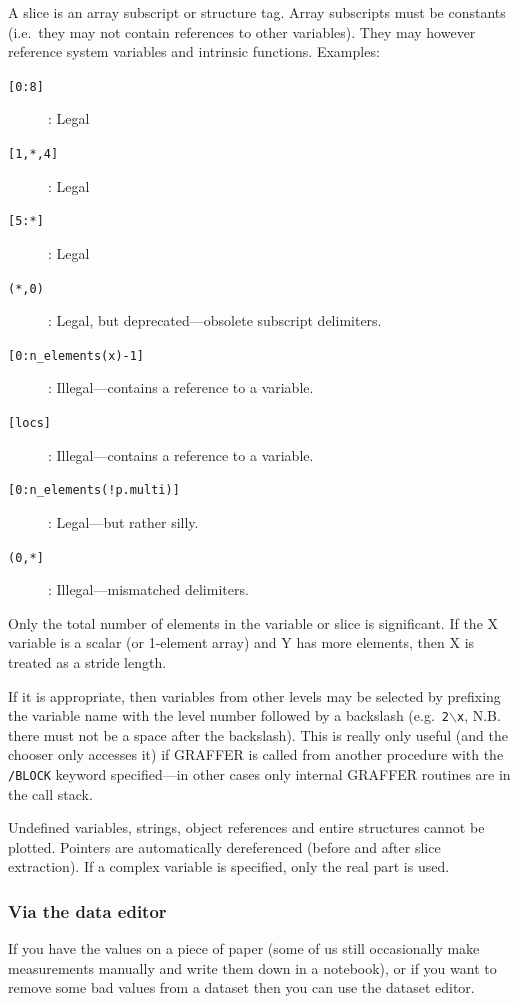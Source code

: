 \documentclass[11pt,twoside,english]{article}
\begin{document}
A slice is an array subscript or structure tag. Array subscripts must
be constants (i.e.\ they may not contain references to other
variables). They may however reference system variables and intrinsic
functions. Examples:
\begin{description}
\item [\texttt{[0:8]}] : Legal
\item [\texttt{[1,*,4]}] : Legal
\item [\texttt{[5:*]}] : Legal
\item[\texttt{(*,0)}] : Legal, but deprecated---obsolete subscript
  delimiters.
\item [\texttt{[0:n\_elements(x)-1]}] : Illegal---contains a reference to
  a variable. 
\item [\texttt{[locs]}] : Illegal---contains a reference to a variable.
\item [\texttt{[0:n\_elements(!p.multi)]}] : Legal---but rather silly.
\item [\texttt{(0,*]}] : Illegal---mismatched delimiters.
\end{description}

Only the total number of elements in the variable or
slice is significant. If the X variable is a scalar (or 1-element
array) and Y has more elements, then X is treated as a stride length.

If it is appropriate, then variables from other levels may be selected
by prefixing the variable name with the level number followed by a
backslash (e.g.\ \texttt{2$\mathtt{\backslash}$x}, N.B. there must not be a
space after the backslash). This is really only useful (and the chooser
only accesses it) if GRAFFER is called from another procedure with the
\texttt{/BLOCK} keyword specified---in other cases only internal
GRAFFER routines are in the call stack.

Undefined variables, strings, object references and entire structures
cannot be plotted. Pointers are automatically dereferenced (before and
after slice extraction). If a complex variable is specified, only the
real part is used.

\subsubsection{Via the data editor }

If you have the values on a piece of paper (some of us still
occasionally make measurements manually and write them down in a
notebook), or if you want to remove some bad values from a dataset then
you can use the dataset editor.
\end{document}
